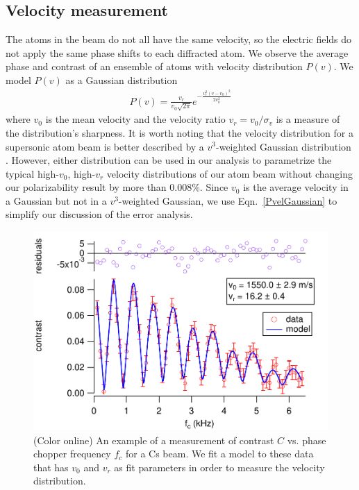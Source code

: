 \documentclass[twocolumn,pra,showpacs,superscriptaddress,longbibliography]{revtex4-1}   %
\newcommand{\eqnref}[1]{Eqn.~\eqref{#1}}
\begin{document}
\subsection{Velocity measurement} \label{sectionVelocity}

The atoms in the beam do not all have the same velocity, so the electric fields do not apply the same phase shifts to each diffracted atom.
We observe the average phase and contrast of an ensemble of atoms with velocity distribution $P(v)$. 
We model $P(v)$ as a Gaussian distribution
\begin{align}
	P(v) = \frac{v_r}{v_0\sqrt{2\pi}}e^{-\frac{v_r^2(v-v_0)^2}{2v_0^2}}
	\label{PvelGaussian}
\end{align}
where $v_0$ is the mean velocity and the velocity ratio $v_r = v_0/\sigma_v$ is a measure of the distribution's sharpness. It is worth noting that the velocity distribution for a supersonic atom beam is better described by a $v^3$-weighted Gaussian distribution
\cite{Berman1997}. However, either distribution can be used in our analysis to parametrize the typical high-$v_0$, high-$v_r$ velocity distributions of our atom beam without changing our polarizability result by more than 0.008\%. Since $v_0$ is the average velocity in a Gaussian but not in a $v^3$-weighted Gaussian, we use \eqnref{PvelGaussian} to simplify our discussion of the error analysis. 


\begin{figure}
\includegraphics[width=\linewidth,keepaspectratio]{CvCF_150420_ca.pdf}
\caption{\label{CvCFExample}(Color online) An example of a measurement of contrast $C$ vs. phase chopper frequency $f_c$ for a Cs beam. We fit a model to these data that has $v_0$ and $v_r$ as fit parameters in order to measure the velocity distribution.}
\end{figure}
\end{document}
